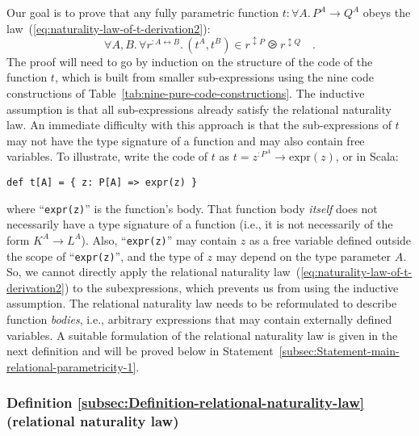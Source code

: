 Our goal is to prove that any fully parametric function $t:\forall A.\,P^{A}\rightarrow Q^{A}$
obeys the law~(\ref{eq:naturality-law-of-t-derivation2}):
\[
\forall A,B.\,\forall r^{:A\leftrightarrow B}.\,(t^{A},t^{B})\in r^{\updownarrow P}\ogreaterthan r^{\updownarrow Q}\quad.
\]
The proof will need to go by induction on the structure of the code
of the function $t$, which is built from smaller sub-expressions
using the nine code constructions of Table~\ref{tab:nine-pure-code-constructions}.
The inductive assumption is that all sub-expressions already satisfy
the relational naturality law. An immediate difficulty with this approach
is that the sub-expressions of $t$ may not have the type signature
of a function and may also contain free variables. To illustrate,
write the code of $t$ as $t=z^{:P^{A}}\rightarrow\text{expr}(z)$,
or in Scala:
\begin{lstlisting}
def t[A] = { z: P[A] => expr(z) }
\end{lstlisting}
where \textsf{``}\lstinline!expr(z)!\textsf{''} is the function\textsf{'}s body. That function
body \emph{itself} does not necessarily have a type signature of a
function (i.e., it is not necessarily of the form $K^{A}\rightarrow L^{A}$).
Also, \textsf{``}\lstinline!expr(z)!\textsf{''} may contain $z$ as a free variable
defined outside the scope of \textsf{``}\lstinline!expr(z)!\textsf{''}, and the type
of $z$ may depend on the type parameter $A$. So, we cannot directly
apply the relational naturality law~(\ref{eq:naturality-law-of-t-derivation2})
to the subexpressions, which prevents us from using the inductive
assumption. The relational naturality law needs to be reformulated
to describe function \emph{bodies}, i.e., arbitrary expressions that
may contain externally defined variables. A suitable formulation of
the relational naturality law is given in the next definition and
will be proved below in Statement~\ref{subsec:Statement-main-relational-parametricity-1}.

\subsubsection{Definition \label{subsec:Definition-relational-naturality-law}\ref{subsec:Definition-relational-naturality-law}
(relational naturality law)}

